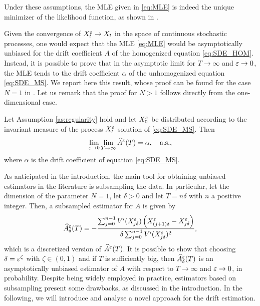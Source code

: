 \documentclass[10pt]{article}
\begin{document}
Under these assumptions, the MLE given in \eqref{eq:MLE} is indeed the unique minimizer of the likelihood function, as shown in \cite[Theorem 2.4]{PSV09}.

Given the convergence of $X^\varepsilon_t \to X_t$ in the space of continuous stochastic processes, one would expect that the MLE \eqref{eq:MLE} would be asymptotically unbiased for the drift coefficient $A$ of the homogenized equation \eqref{eq:SDE_HOM}. Instead, it is possible to prove that in the asymptotic limit for $T \to \infty$ and $\varepsilon \to 0$, the MLE tends to the drift coefficient $\alpha$ of the unhomogenized equation \eqref{eq:SDE_MS}. We report here this result, whose proof can be found for the case $N = 1$ in \cite[Theorem 3.4]{PaS07}. Let us remark that the proof for $N > 1$ follows directly from the one-dimensional case.

\begin{theorem}\label{thm:Bias} Let Assumption \ref{as:regularity} hold and let $X^\varepsilon_0$ be distributed according to the invariant measure of the process $X_t^\varepsilon$ solution of \eqref{eq:SDE_MS}. Then
	\begin{equation}
		\lim_{\varepsilon \to 0}\lim_{T \to \infty} \widehat A^\varepsilon(T) = \alpha, \quad \text{a.s.},
	\end{equation}
	where $\alpha$ is the drift coefficient of equation \eqref{eq:SDE_MS}.
\end{theorem}

As anticipated in the introduction, the main tool for obtaining unbiased estimators in the literature is subsampling the data. In particular, let the dimension of the parameter $N = 1$, let $\delta > 0$ and let $T = n\delta$ with $n$ a positive integer. Then, a subsampled estimator for $A$ is given by
\begin{equation}
	\widehat A^\varepsilon_\delta(T) = - \frac{\sum_{j=0}^{n-1} V'(X^\varepsilon_{j\delta})\left(X^\varepsilon_{(j+1)\delta} - X^\varepsilon_{j\delta}\right)}{\delta \sum_{j=0}^{n-1} V'(X^\varepsilon_{j\delta})^2},
\end{equation}
which is a discretized version of $\widehat A^\varepsilon(T)$. It is possible to show \cite[Theorem 3.5]{PaS07} that choosing $\delta = \varepsilon^\zeta$ with $\zeta \in (0, 1)$ and if $T$ is sufficiently big, then $\widehat A^\varepsilon_\delta(T)$ is an asymptotically unbiased estimator of $A$ with respect to $T \to \infty$ and $\varepsilon \to 0$, in probability. Despite being widely employed in practice, estimators based on subsampling present some drawbacks, as discussed in the introduction. In the following, we will introduce and analyse a novel approach for the drift estimation.
\end{document}
